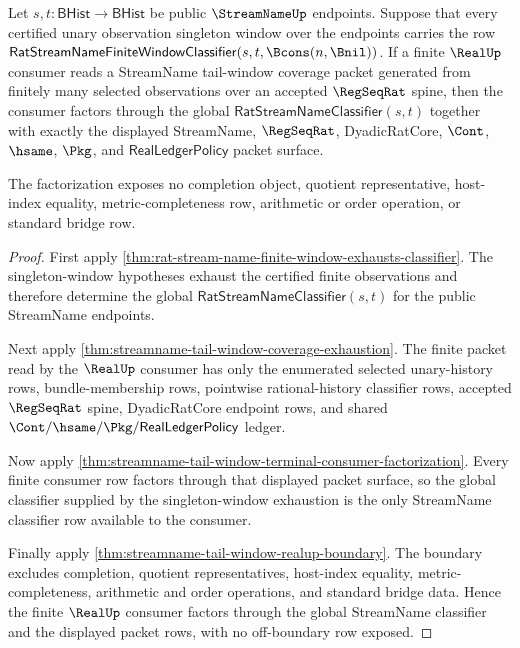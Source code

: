 \begin{theorem}
\label{thm:streamname-tail-window-global-classifier-boundary}
Let $s,t:\mathsf{BHist}\to\mathsf{BHist}$ be public $\StreamNameUp$
endpoints. Suppose that every certified unary observation singleton window
over the endpoints carries the row
$\mathsf{RatStreamNameFiniteWindowClassifier}(s,t,\Bcons(n,\Bnil))$. If a
finite $\RealUp$ consumer reads a StreamName tail-window coverage packet
generated from finitely many selected observations over an accepted
$\RegSeqRat$ spine, then the consumer factors through the global
$\mathsf{RatStreamNameClassifier}(s,t)$ together with exactly the displayed
StreamName, $\RegSeqRat$, DyadicRatCore, $\Cont$, $\hsame$, $\Pkg$, and
$\mathsf{RealLedgerPolicy}$ packet surface.

The factorization exposes no completion object, quotient representative,
host-index equality, metric-completeness row, arithmetic or order operation,
or standard bridge row.
\end{theorem}
\begin{proof}
First apply
\autoref{thm:rat-stream-name-finite-window-exhausts-classifier}. The
singleton-window hypotheses exhaust the certified finite observations and
therefore determine the global
$\mathsf{RatStreamNameClassifier}(s,t)$ for the public StreamName endpoints.

Next apply \autoref{thm:streamname-tail-window-coverage-exhaustion}. The
finite packet read by the $\RealUp$ consumer has only the enumerated selected
unary-history rows, bundle-membership rows, pointwise rational-history
classifier rows, accepted $\RegSeqRat$ spine, DyadicRatCore endpoint rows,
and shared $\Cont/\hsame/\Pkg/\mathsf{RealLedgerPolicy}$ ledger.

Now apply
\autoref{thm:streamname-tail-window-terminal-consumer-factorization}. Every
finite consumer row factors through that displayed packet surface, so the
global classifier supplied by the singleton-window exhaustion is the only
StreamName classifier row available to the consumer.

Finally apply \autoref{thm:streamname-tail-window-realup-boundary}. The
boundary excludes completion, quotient representatives, host-index equality,
metric-completeness, arithmetic and order operations, and standard bridge
data. Hence the finite $\RealUp$ consumer factors through the global
StreamName classifier and the displayed packet rows, with no off-boundary row
exposed.
\end{proof}

